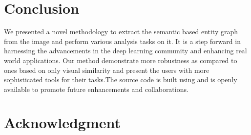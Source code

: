 \documentclass[conference]{IEEEtran}
\begin{document}
%





\section{Conclusion}
We presented a novel methodology to extract the semantic based entity graph from the image and perform various analysis tasks on it. It is a step forward in harnessing the advancements in the deep learning community and enhancing real world applications. Our method demonstrate more robustness as compared to ones based on only visual similarity and present the users with more sophisticated tools for their tasks.The source code is built using \cite{tensorflow} \cite{random}and is openly available to promote future enhancements and collaborations.




\section*{Acknowledgment}
\end{document}
